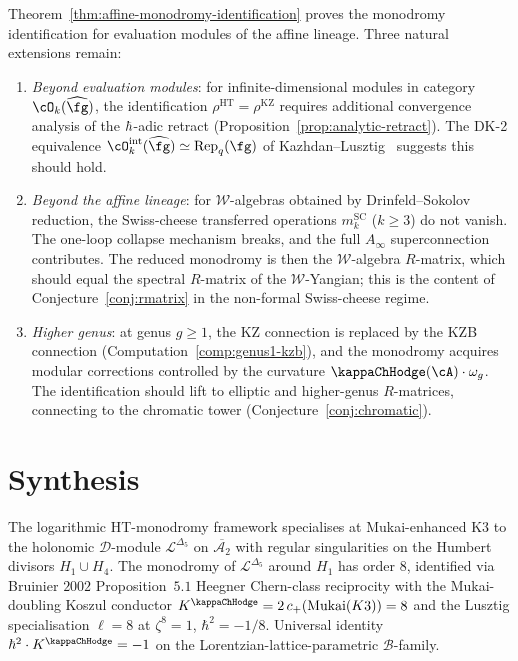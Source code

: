 \begin{remark}
\label{rem:affine-scope}
Theorem~\ref{thm:affine-monodromy-identification} proves the monodromy identification for evaluation modules of the affine lineage. Three natural extensions remain:
\begin{enumerate}[label=\textup{(\alph*)}]
 \item \emph{Beyond evaluation modules}: for infinite-dimensional modules in category $\cO_k(\widehat{\fg})$, the identification $\rho^{\mathrm{HT}} = \rho^{\mathrm{KZ}}$ requires additional convergence analysis of the $\hbar$-adic retract (Proposition~\ref{prop:analytic-retract}). The DK-2 equivalence $\cO_k^{\mathrm{int}}(\widehat{\fg}) \simeq \mathrm{Rep}_q(\fg)$ of Kazhdan--Lusztig~\cite{KL93} suggests this should hold.
 \item \emph{Beyond the affine lineage}: for $\mathcal{W}$-algebras obtained by Drinfeld--Sokolov reduction, the Swiss-cheese transferred operations $m_k^{\mathrm{SC}}$ ($k \geq 3$) do not vanish. The one-loop collapse mechanism breaks, and the full $A_\infty$ superconnection contributes. The reduced monodromy is then the $\mathcal{W}$-algebra $R$-matrix, which should equal the spectral $R$-matrix of the $\mathcal{W}$-Yangian; this is the content of Conjecture~\ref{conj:rmatrix} in the non-formal Swiss-cheese regime.
 \item \emph{Higher genus}: at genus $g \geq 1$, the KZ connection is replaced by the KZB connection (Computation~\ref{comp:genus1-kzb}), and the monodromy acquires modular corrections controlled by the curvature $\kappaChHodge(\cA) \cdot \omega_g$. The identification should lift to elliptic and higher-genus $R$-matrices, connecting to the chromatic tower (Conjecture~\ref{conj:chromatic}).
\end{enumerate}
\end{remark}


\section{Synthesis}
\label{sec:loght-core-supplement}

\begin{remark}
\label{rem:loght-core-humbert}
The logarithmic HT-monodromy framework specialises at Mukai-enhanced K3 to the holonomic $\mathcal{D}$-module $\mathcal{L}^{\Delta_5}$ on $\overline{\mathcal{A}_2}$ with regular singularities on the Humbert divisors $H_1 \cup H_4$. The monodromy of $\mathcal{L}^{\Delta_5}$ around $H_1$ has order $8$, identified via Bruinier $2002$ Proposition~$5.1$ Heegner Chern-class reciprocity with the Mukai-doubling Koszul conductor $K^{\kappaChHodge} = 2\,c_+(\mathrm{Mukai}(K3)) = 8$ and the Lusztig specialisation $\ell = 8$ at $\zeta^8 = 1$, $\hbar^2 = -1/8$. Universal identity $\hbar^2 \cdot K^{\kappaChHodge} = -1$ on the Lorentzian-lattice-parametric $\mathcal{B}$-family.
\end{remark}
